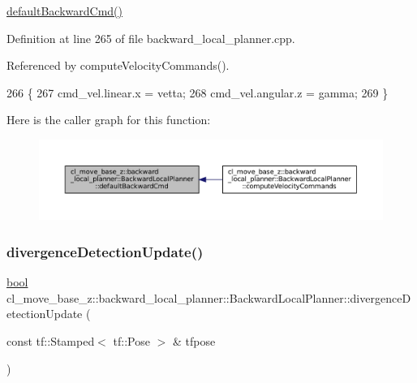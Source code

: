 \hyperlink{classcl__move__base__z_1_1backward__local__planner_1_1BackwardLocalPlanner_a1ebd69a028a22e3573e98f89d593f97d}{default\+Backward\+Cmd()} 

Definition at line 265 of file backward\+\_\+local\+\_\+planner.\+cpp.



Referenced by compute\+Velocity\+Commands().


\begin{DoxyCode}
266         \{
267             cmd\_vel.linear.x = vetta;
268             cmd\_vel.angular.z = gamma;
269         \}
\end{DoxyCode}
Here is the caller graph for this function\+:
\nopagebreak
\begin{figure}[H]
\begin{center}
\leavevmode
\includegraphics[width=350pt]{classcl__move__base__z_1_1backward__local__planner_1_1BackwardLocalPlanner_a1ebd69a028a22e3573e98f89d593f97d_icgraph}
\end{center}
\end{figure}
\mbox{\label{classcl__move__base__z_1_1backward__local__planner_1_1BackwardLocalPlanner_ab1b01ecdb27641dde60661362d75465b}} 
\subsubsection{\texorpdfstring{divergence\+Detection\+Update()}{divergenceDetectionUpdate()}}
{\footnotesize\ttfamily \hyperlink{classbool}{bool} cl\+\_\+move\+\_\+base\+\_\+z\+::backward\+\_\+local\+\_\+planner\+::\+Backward\+Local\+Planner\+::divergence\+Detection\+Update (\begin{DoxyParamCaption}\item[{const tf\+::\+Stamped$<$ tf\+::\+Pose $>$ \&}]{tfpose }\end{DoxyParamCaption})\hspace{0.3cm}{\ttfamily [private]}}



